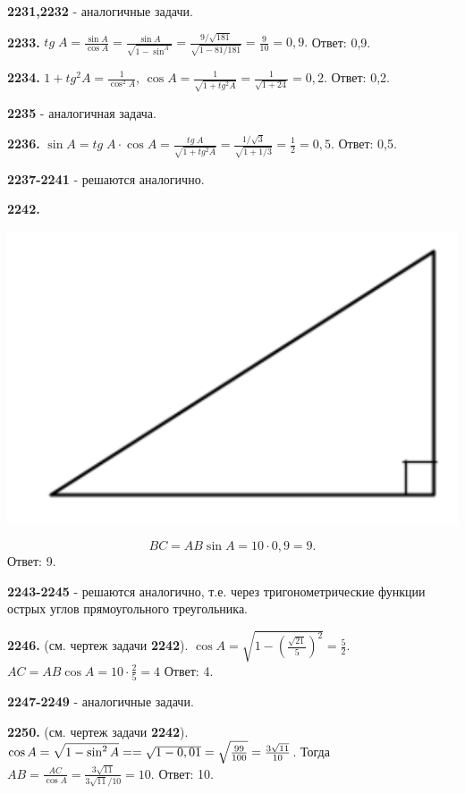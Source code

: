  \textbf{2231,2232} - аналогичные задачи.
 
 \textbf{2233.} $tg\;A=\frac{\sin{A}}{\cos{A}}=\frac{\sin{A}}{\sqrt{1-\sin^{A}}} = \frac{9/\sqrt{181}}{\sqrt{1 - 81/181}}=\frac{9}{10}=0,9.$ \newline \null \hspace*{\fill} Ответ: 0,9.
 
 \textbf{2234.} $1 + tg^2A=\frac{1}{\cos^2{A}}$, $\cos{A} = \frac{1}{\sqrt{1+tg^2A}}=\frac{1}{\sqrt{1+24}} = 0,2.$ \newline \null \hspace*{\fill} Ответ: 0,2.
 
 \textbf{2235} - аналогичная задача.
 
 \textbf{2236.} $\sin{A} = tg\; A\cdot \cos{A} = \frac{tg\;A}{\sqrt{1+tg^2A}}=\frac{1/\sqrt{3}}{\sqrt{1+1/3}}=\frac{1}{2}=0,5$. \newline \null \hspace*{\fill} Ответ: 0,5.
 
 \textbf{2237-2241} - решаются аналогично.
 
 \clearpage
 \textbf{2242.}
 
 {\centering \includegraphics[width=0.4\linewidth]{Geometry/Content/51.png}
 	
 }
\[
BC=AB\sin{A}=10\cdot0,9=9.
\]
\null \hspace*{\fill} Ответ: 9.

\textbf{2243-2245} - решаются аналогично, т.е. через тригонометрические функции острых углов прямоугольного треугольника.

\textbf{2246.} (см. чертеж задачи \textbf{2242}). $\cos{A} = \sqrt{1-\left( \frac{\sqrt{21}}{5} \right)^2} = \frac{5}{2}.$ $AC=AB\cos{A}=10\cdot\frac{2}{5}=4$ \newline \null \hspace*{\fill} Ответ: 4.

\textbf{2247-2249} - аналогичные задачи.

\textbf{2250.} (см. чертеж задачи \textbf{2242}). $\cos{A} = \sqrt{1-\sin^2{A}} = \linebreak= \sqrt{1-0,01}=\sqrt{\frac{99}{100}}=\frac{3\sqrt{11}}{10}$. Тогда $AB=\frac{AC}{\cos{A}}=\frac{3\sqrt{11}}{3\sqrt{11}/10}=10.$ \newline \null \hspace*{\fill} Ответ: 10.

